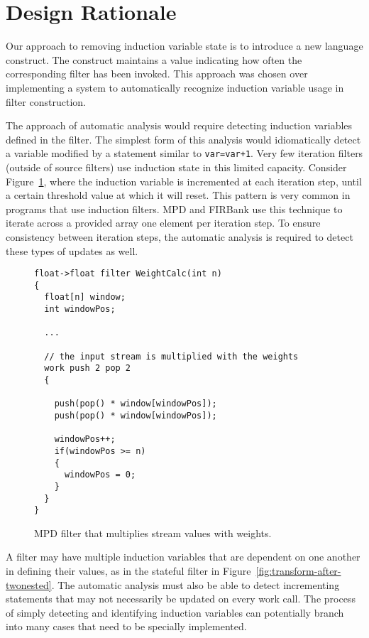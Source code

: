 \section{Design Rationale}
\label{sec:designrationale}

Our approach to removing induction variable state is to introduce a new language construct.  The construct maintains a value indicating how often the corresponding filter has been invoked.  This approach was chosen over implementing a system to automatically recognize induction variable usage in filter construction.

The approach of automatic analysis would require detecting induction variables defined in the filter.  The simplest form of this analysis would idiomatically detect a variable modified by a statement similar to \texttt{var=var+1}.  Very few iteration filters (outside of source filters) use induction state in this limited capacity.  Consider Figure~\ref{fig:weight-calc}, where the induction variable is incremented at each iteration step, until a certain threshold value at which it will reset.  This pattern is very common in programs that use induction filters.  MPD and FIRBank use this technique to iterate across a provided array one element per iteration step.  To ensure consistency between iteration steps, the automatic analysis is required to detect these types of updates as well.  

\begin{figure}[t]
{\eightpoint
\begin{verbatim}
float->float filter WeightCalc(int n)
{
  float[n] window;
  int windowPos;

  ...

  // the input stream is multiplied with the weights
  work push 2 pop 2
  {

    push(pop() * window[windowPos]);
    push(pop() * window[windowPos]);

    windowPos++;
    if(windowPos >= n)
    {
      windowPos = 0;
    }
  }
}
\end{verbatim}
\caption{MPD filter that multiplies stream values with weights.\protect\label{fig:weight-calc}}}
\end{figure}

A filter may have multiple induction variables that are dependent on one another in defining their values, as in the stateful filter in Figure~\ref{fig:transform-after-twonested}.  The automatic analysis must also be able to detect incrementing statements that may not necessarily be updated on every work call.  The process of simply detecting and identifying induction variables can potentially branch into many cases that need to be specially implemented.

